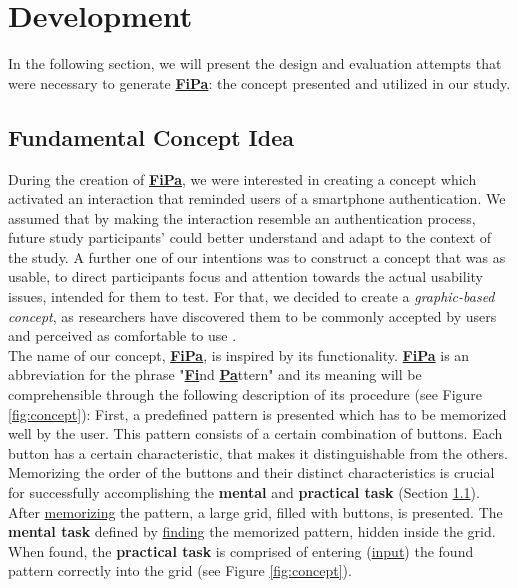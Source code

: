 \section{Development} \label{4.2}

In the following section, we will present the design and evaluation attempts that were necessary to generate \underline{\textbf{FiPa}}: the concept presented and utilized in our study. 

\subsection{Fundamental Concept Idea} \label{4.2.1}

During the creation of \underline{\textbf{FiPa}}, we were interested in creating a concept which activated an interaction that reminded users of a smartphone authentication. We assumed that by making the interaction resemble an authentication process, future study participants' could better understand and adapt to the context of the study. A further one of our intentions was to construct a concept that was as usable, to direct participants focus and attention towards the actual usability issues, intended for them to test. For that, we decided to create a \textit{graphic-based concept}, as researchers have discovered them to be commonly accepted by users and perceived as comfortable to use \cite{PatternWild}. \\ 

The name of our concept, \underline{\textbf{FiPa}}, is inspired by its functionality. \underline{\textbf{FiPa}} is an abbreviation for the phrase "\underline{\textbf{Fi}}nd \underline{\textbf{Pa}}ttern" and its meaning will be comprehensible through the following description of its procedure (see Figure \ref{fig:concept}): First, a predefined pattern is presented which has to be memorized well by the user. This pattern consists of a certain combination of buttons. Each button has a certain characteristic, that makes it distinguishable from the others. Memorizing the order of the buttons and their distinct characteristics is crucial for successfully accomplishing the \textbf{mental} and \textbf{practical task} (Section \ref{4.2.1}). After \underline{memorizing} the pattern, a large grid, filled with buttons, is presented. The \textbf{mental task} defined by \underline{finding} the memorized pattern, hidden inside the grid. When found, the \textbf{practical task} is comprised of entering  (\underline{input}) the found pattern correctly into the grid (see Figure \ref{fig:concept}).\\

